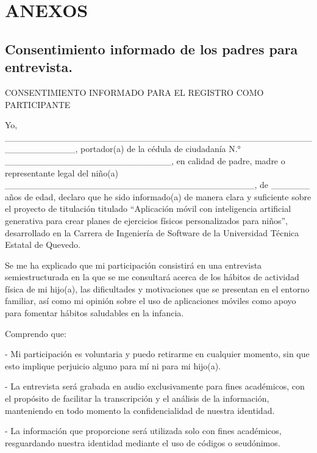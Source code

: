 \clearpage
\appendix
\chapter{ANEXOS}

	\section[Entrevistas a representantes legales]{Consentimiento informado de los padres para entrevista.}
		CONSENTIMIENTO INFORMADO PARA EL REGISTRO COMO PARTICIPANTE
		
		Yo, \_\_\_\_\_\_\_\_\_\_\_\_\_\_\_\_\_\_\_\_\_\_\_\_\_\_\_\_\_\_\_\_\_\_\_\_\_\_\_\_\_\_\_\_\_\_\_\_\_\_\_\_\_\_\_\_\_\_\_, portador(a) de la cédula de ciudadanía N.° \_\_\_\_\_\_\_\_\_\_\_\_\_\_\_\_\_\_\_\_\_\_\_\_\_\_, en calidad de padre, madre o representante legal del niño(a) \_\_\_\_\_\_\_\_\_\_\_\_\_\_\_\_\_\_\_\_\_\_\_\_\_\_\_\_\_\_\_\_\_\_\_\_\_\_\_, de \_\_\_\_\_\_ años de edad, declaro que he sido informado(a) de manera clara y suficiente sobre el proyecto de titulación titulado ``Aplicación móvil con inteligencia artificial generativa para crear planes de ejercicios físicos personalizados para niños'', desarrollado en la Carrera de Ingeniería de Software de la Universidad Técnica Estatal de Quevedo.
		
		Se me ha explicado que mi participación consistirá en una entrevista semiestructurada en la que se me consultará acerca de los hábitos de actividad física de mi hijo(a), las dificultades y motivaciones que se presentan en el entorno familiar, así como mi opinión sobre el uso de aplicaciones móviles como apoyo para fomentar hábitos saludables en la infancia.
		
		Comprendo que:
		
		- Mi participación es voluntaria y puedo retirarme en cualquier momento, sin que esto implique perjuicio alguno para mí ni para mi hijo(a).
		
		- La entrevista será grabada en audio exclusivamente para fines académicos, con el propósito de facilitar la transcripción y el análisis de la información, manteniendo en todo momento la confidencialidad de nuestra identidad.
		
		- La información que proporcione será utilizada solo con fines académicos, resguardando nuestra identidad mediante el uso de códigos o seudónimos.
		
